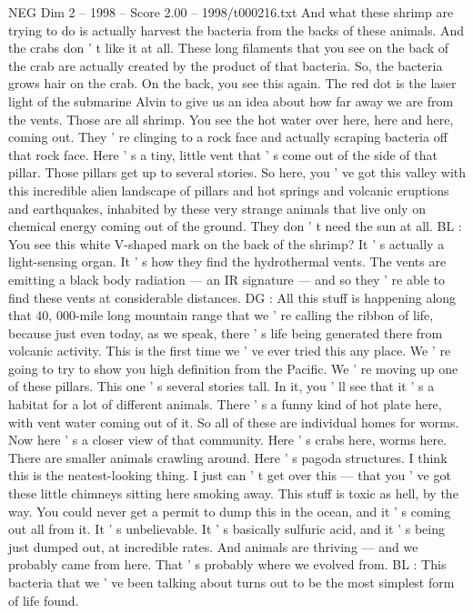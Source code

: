 \begin{textsample}{NEG Dim 2 – 1998 – Score 2.00 – 1998/t000216.txt}
And what these shrimp are trying to do is actually harvest the bacteria from the backs of these animals.
And the crabs don ' t like it at all.
These long filaments that you see on the back of the crab are actually created by the product of that bacteria.
So, the bacteria grows hair on the crab.
On the back, you see this again.
The red dot is the laser light of the submarine Alvin to give us an idea about how far away we are from the vents.
Those are all shrimp.
You see the hot water over here, here and here, coming out.
They ' re clinging to a rock face and actually scraping bacteria off that rock face.
Here ' s a tiny, little vent that ' s come out of the side of that pillar.
Those pillars get up to several stories.
So here, you ' ve got this valley with this incredible alien landscape of pillars and hot springs and volcanic eruptions and earthquakes, inhabited by these very strange animals that live only on chemical energy coming out of the ground.
They don ' t need the sun at all.
BL : You see this white V-shaped mark on the back of the shrimp?
It ' s actually a light-sensing organ.
It ' s how they find the hydrothermal vents.
The vents are emitting a black body radiation — an IR signature — and so they ' re able to find these vents at considerable distances.
DG : All this stuff is happening along that 40, 000-mile long mountain range that we ' re calling the ribbon of life, because just even today, as we speak, there ' s life being generated there from volcanic activity.
This is the first time we ' ve ever tried this any place.
We ' re going to try to show you high definition from the Pacific.
We ' re moving up one of these pillars.
This one ' s several stories tall.
In it, you ' ll see that it ' s a habitat for a lot of different animals.
There ' s a funny kind of hot plate here, with vent water coming out of it.
So all of these are individual homes for worms.
Now here ' s a closer view of that community.
Here ' s crabs here, worms here.
There are smaller animals crawling around.
Here ' s pagoda structures.
I think this is the neatest-looking thing.
I just can ' t get over this — that you ' ve got these little chimneys sitting here smoking away.
This stuff is toxic as hell, by the way.
You could never get a permit to dump this in the ocean, and it ' s coming out all from it.
It ' s unbelievable.
It ' s basically sulfuric acid, and it ' s being just dumped out, at incredible rates.
And animals are thriving — and we probably came from here.
That ' s probably where we evolved from.
BL : This bacteria that we ' ve been talking about turns out to be the most simplest form of life found.

\end{textsample}
